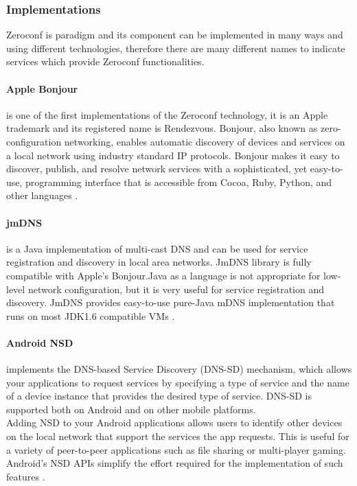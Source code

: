 \subsubsection{Implementations}
Zeroconf is paradigm and its component can be implemented in many ways and using different technologies, therefore there are many different names to indicate services which provide Zeroconf functionalities.
\paragraph{Apple Bonjour} is one of the first implementations of the Zeroconf technology, it is an Apple trademark and its registered name is Rendezvous. Bonjour, also known as zero-configuration networking, enables automatic discovery of devices and services on a local network using industry standard IP protocols. Bonjour makes it easy to discover, publish, and resolve network services with a sophisticated, yet easy-to-use, programming interface that is accessible from Cocoa, Ruby, Python, and other languages \cite{apple2017bonjour}.

\paragraph{jmDNS} is a Java implementation of multi-cast DNS and can be used for service registration and discovery in local area networks. JmDNS library is fully compatible with Apple's Bonjour.Java as a language is not appropriate for low-level network configuration, but it is very useful for service registration and discovery. JmDNS provides easy-to-use pure-Java mDNS implementation that runs on most JDK1.6 compatible VMs \cite{sourceforge2011jmdns}.

\paragraph{Android NSD} implements the DNS-based Service Discovery (DNS-SD) mechanism, which allows your applications to request services by specifying a type of service and the name of a device instance that provides the desired type of service. DNS-SD is supported both on Android and on other mobile platforms.\\
Adding NSD to your Android applications allows users to identify other devices on the local network that support the services the app requests. This is useful for a variety of peer-to-peer applications such as file sharing or multi-player gaming. Android's NSD APIs simplify the effort required for the implementation of such features \cite{devandroidnsd}.







%
